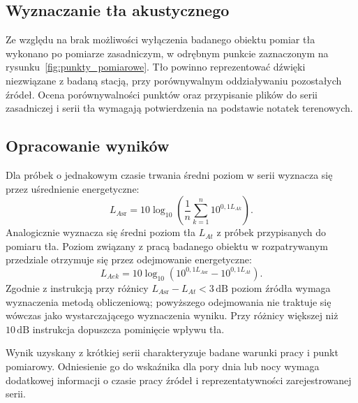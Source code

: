 \subsection{Wyznaczanie tła akustycznego}
Ze względu na brak możliwości wyłączenia badanego obiektu
pomiar tła wykonano po pomiarze zasadniczym, w odrębnym punkcie
zaznaczonym na rysunku~\ref{fig:punkty_pomiarowe}.
Tło powinno reprezentować dźwięki niezwiązane z badaną stacją,
przy porównywalnym oddziaływaniu pozostałych źródeł.
Ocena porównywalności punktów oraz przypisanie plików do serii
zasadniczej i serii tła wymagają potwierdzenia na podstawie
notatek terenowych.

\subsection{Opracowanie wyników}
Dla próbek o jednakowym czasie trwania średni poziom
w serii wyznacza się przez uśrednienie energetyczne:
\begin{equation}
 L_{A\mathrm{sr}}=10\log_{10}\left(
 \frac{1}{n}\sum_{k=1}^{n}10^{0{,}1L_{Ak}}\right).
 \label{eq:srednia-energetyczna}
\end{equation}
Analogicznie wyznacza się średni poziom tła $L_{At}$
z próbek przypisanych do pomiaru tła.
Poziom związany z pracą badanego obiektu w rozpatrywanym
przedziale otrzymuje się przez odejmowanie energetyczne:
\begin{equation}
 L_{Aek}=10\log_{10}\left(
 10^{0{,}1L_{A\mathrm{sr}}}-10^{0{,}1L_{At}}\right).
 \label{eq:korekcja-tla}
\end{equation}
Zgodnie z instrukcją przy różnicy
$L_{A\mathrm{sr}}-L_{At}<3\,\mathrm{dB}$
poziom źródła wymaga wyznaczenia metodą obliczeniową;
powyższego odejmowania nie traktuje się wówczas jako
wystarczającego wyznaczenia wyniku.
Przy różnicy większej niż $10\,\mathrm{dB}$ instrukcja
dopuszcza pominięcie wpływu tła.

Wynik uzyskany z krótkiej serii charakteryzuje badane warunki
pracy i punkt pomiarowy. Odniesienie go do wskaźnika dla pory
dnia lub nocy wymaga dodatkowej informacji o czasie pracy
źródeł i reprezentatywności zarejestrowanej serii.
